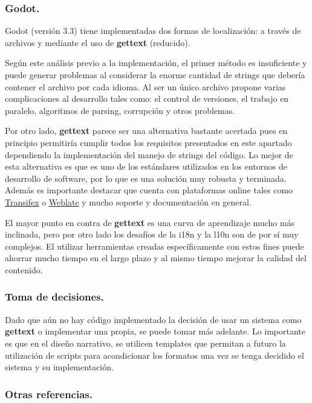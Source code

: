 \subsubsection{Godot.}\label{i18n:i18n-godot}
Godot (versión 3.3) tiene implementadas dos formas de localización: a través de archivos  y mediante el uso de \textbf{gettext} (reducido).

Según este análisis previo a la implementación, el primer método es insuficiente y puede generar problemas al considerar la enorme cantidad de strings que debería contener el archivo  por cada idioma. Al ser un único archivo propone varias complicaciones al desarrollo tales como: el control de versiones, el trabajo en paralelo, algoritmos de parsing, corrupción y otros problemas.

Por otro lado, \textbf{gettext} parece ser una alternativa bastante acertada pues en principio permitiría cumplir todos los requisitos presentados en este apartado dependiendo la implementación del manejo de strings del código. Lo mejor de esta alternativa es que es uno de los estándares utilizados en los entornos de desarrollo de software, por lo que es una solución muy robusta y terminada. Además es importante destacar que cuenta con plataformas online tales como \href{https://www.transifex.com/}{Transifex} o \href{https://weblate.org}{Weblate} y mucho soporte y documentación en general.

El mayor punto en contra de \textbf{gettext} es una curva de aprendizaje mucho más inclinada, pero por otro lado los desafíos de la i18n y la l10n son de por sí muy complejos. El utilizar herramientas creadas específicamente con estos fines puede ahorrar mucho tiempo en el largo plazo y al mismo tiempo mejorar la calidad del contenido.

\subsubsection{Toma de decisiones.}\label{i18n:decisiones-i18n}
Dado que aún no hay código implementado la decisión de usar un sistema como \textbf{gettext} o implementar una  propia, se puede tomar más adelante. Lo importante es que en el diseño narrativo, se utilicen templates que permitan a futuro la utilización de scripts para acondicionar los formatos una vez se tenga decidido el sistema y su implementación.

\subsubsection{Otras referencias.}\label{i18n:otras-referencias}

